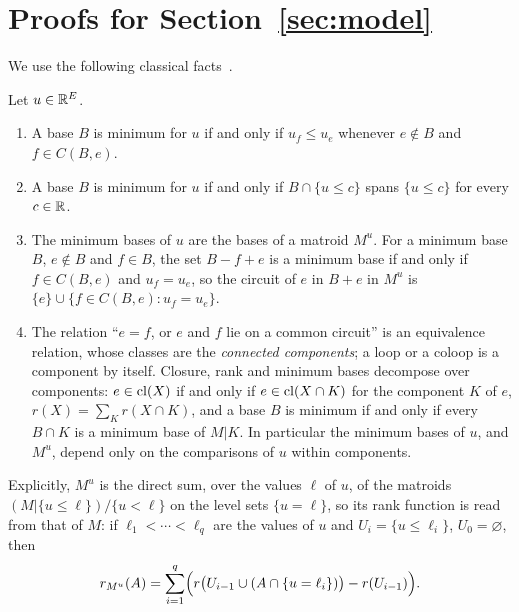
\section{Proofs for Section~\texorpdfstring{\ref{sec:model}}{2}}
\label{app:model}

We use the following classical facts~\cite{oxley11,schrijver03}.

\begin{lemma}
\label{lem:minbases}
Let $u\in\mathbb R^{E}$.
\begin{enumerate}
  \item A base $B$ is minimum for $u$ if and only if $u_f\le u_e$ whenever
        $e\notin B$ and $f\in C(B,e)$.
  \item A base $B$ is minimum for $u$ if and only if $B\cap\{u\le c\}$ spans
        $\{u\le c\}$ for every $c\in\mathbb R$.
  \item The minimum bases of $u$ are the bases of a matroid $M^{u}$.  For a
        minimum base $B$, $e\notin B$ and $f\in B$, the set $B-f+e$ is a minimum
        base if and only if $f\in C(B,e)$ and $u_f=u_e$, so the circuit of $e$ in
        $B+e$ in $M^{u}$ is $\{e\}\cup\{f\in C(B,e):u_f=u_e\}$.
  \item The relation ``$e=f$, or $e$ and $f$ lie on a common circuit'' is an
        equivalence relation, whose classes are the \emph{connected components};
        a loop or a coloop is a component by itself.  Closure, rank and minimum
        bases decompose over components: $e\in\operatorname{cl}(X)$ if and only if
        $e\in\operatorname{cl}(X\cap K)$ for the component $K$ of $e$, $r(X)=\sum_Kr(X\cap K)$,
        and a base $B$ is minimum if and only if every $B\cap K$ is a minimum base
        of $M|K$.  In particular the minimum bases of $u$, and $M^{u}$, depend
        only on the comparisons of $u$ within components.
\end{enumerate}
\end{lemma}

Explicitly, $M^{u}$ is the direct sum, over the values $\ell$ of $u$, of the
matroids $(M|\{u\le\ell\})/\{u<\ell\}$ on the level sets $\{u=\ell\}$, so its
rank function is read from that of $M$: if $\ell_1<\cdots<\ell_q$ are the values
of $u$ and $U_i=\{u\le\ell_i\}$, $U_0=\varnothing$, then
\begin{equation}
  r_{M^{u}}(A)=\sum_{i=1}^{q}\Bigl(r\bigl(U_{i-1}\cup(A\cap\{u=\ell_i\})\bigr)-r(U_{i-1})\Bigr).
  \label{eq:rank-mu}
\end{equation}

